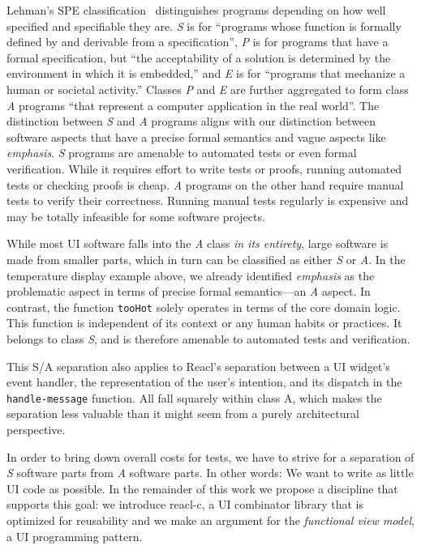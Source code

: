 \documentclass[sigplan,review,screen]{acmart}
\begin{document}
Lehman's SPE classification~\cite{SPE} distinguishes programs
depending on how well specified and specifiable they are.
\textit{S} is for ``programs whose function is formally defined by and
derivable from a specification'', \textit{P} is for programs that have
a formal specification, but ``the acceptability of a solution is
determined by the environment in which it is embedded,'' and
\textit{E} is for ``programs that mechanize a human or societal
activity.'' Classes \textit{P} and \textit{E} are further aggregated
to form class \textit{A} programs ``that represent a computer
application in the real world''. The distinction between \textit{S}
and \textit{A} programs aligns with our distinction between software
aspects that have a precise formal semantics and vague aspects like
\textit{emphasis}. \textit{S} programs are amenable to automated tests
or even formal verification. While it requires effort to write tests
or proofs, running automated tests or checking proofs is
cheap. \textit{A} programs on the other hand require manual tests to
verify their correctness. Running manual tests regularly is expensive
and may be totally infeasible for some software projects.

While most UI software falls into the \textit{A} class \textit{in its
  entirety}, large software is made from smaller parts, which in turn
can be classified as either \textit{S} or \textit{A}. In the
temperature display example above, we already identified
\textit{emphasis} as the problematic aspect in terms of precise formal
semantics---an \textit{A} aspect. In contrast, the function
\texttt{tooHot} solely operates in terms of the core domain
logic. This function is independent of its context or any human habits
or practices. It belongs to class \textit{S}, and is therefore
amenable to automated tests and verification.

This S/A separation also applies to Reacl's separation between a UI
widget's event handler, the representation of the user's intention,
and its dispatch in the \texttt{handle-message} function.  All fall
squarely within class A, which makes the separation less valuable than
it might seem from a purely architectural perspective.

In order to bring down overall costs for tests, we have to strive for
a separation of \textit{S} software parts from
\textit{A} software parts. In other words: We want to write as little
UI code as possible. In the remainder of this work we propose a
discipline that supports this goal: we introduce reacl-c, a UI
combinator library that is optimized for reusability and we make an
argument for the \textit{functional view model}, a UI programming
pattern.
\end{document}
